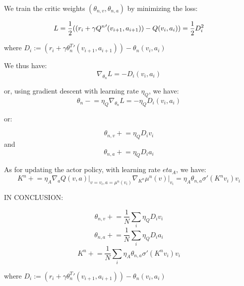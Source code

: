 We train the critic weights $(\theta_{n,v}, \theta_{n,a})$ by minimizing the loss:

$$L = \frac{1}{2}((r_i + \gamma {Q^n}'(v_{i+1}, a_{i+1})) -  Q(v_{i}, a_{i})) \\
= \frac{1}{2}D_i^2$$


where $D_i := (r_i + \gamma {\theta_n^T}' (v_{i+1}, a_{i+1})) - \theta_n (v_{i}, a_{i}) $

We thus have:
$$\nabla_{\theta_n} L = -D_i (v_{i}, a_{i})$$

or, using gradient descent with learning rate $\eta_Q$, we have:
$$\theta_n \mathrel{-}= \eta_Q \nabla_{\theta_n} L = -\eta_Q D_i (v_{i}, a_{i})$$

or:

$$\theta_{n,v} \mathrel{+}= \eta_Q D_i v_i$$
and
$$\theta_{n,a} \mathrel{+}= \eta_Q D_i a_i$$

As for updating the actor policy, with learning rate $eta_A$, we have:
$$K^n \mathrel{+}= \eta_A \nabla_a Q(v, a) \vert_{v=v_i, a=\mu^n(v_i)} \nabla_{K^n} \mu^n(v) \vert_{v_i} = \eta_A \theta_{n,a} \sigma'(K^n v_i) v_i$$

IN CONCLUSION:

$$\theta_{n,v} \mathrel{+}= \frac{1}{N} \sum_i \eta_Q D_i v_i$$
$$\theta_{n,a} \mathrel{+}= \frac{1}{N} \sum_i \eta_Q D_i a_i$$
$$K^n \mathrel{+}= \frac{1}{N} \sum_i \eta_A \theta_{n,a} \sigma'(K^n v_i) v_i$$

where $D_i := (r_i + \gamma {\theta_n^T}' (v_{i+1}, a_{i+1})) - \theta_n (v_{i}, a_{i}) $

